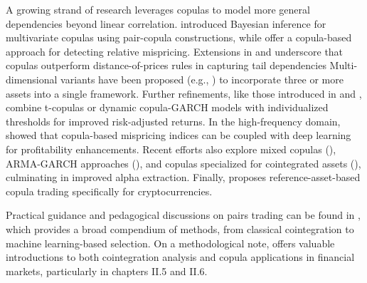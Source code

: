 A growing strand of research leverages copulas to model more general dependencies beyond linear correlation.
\cite{Min2010} introduced Bayesian inference for multivariate copulas using pair-copula constructions, while \cite{stander2013trading} offer a copula-based approach for detecting relative mispricing. 
Extensions in \cite{Liew2013} and \cite{Xie2016} underscore that copulas outperform distance-of-prices rules in capturing tail dependencies 
Multi-dimensional variants have been proposed (e.g., \cite{lau2016multi}) to incorporate three or more assets into a single framework. Further refinements, like those introduced in \cite{Krauss2017} and \cite{zhi2017dynamic}, combine t-copulas or dynamic copula-GARCH models with individualized thresholds for improved risk-adjusted returns. In the high-frequency domain, \cite{Chu2018} showed that copula-based mispricing indices can be coupled with deep learning for profitability enhancements. Recent efforts also explore mixed copulas (\cite{SabinodaSilva2023}), ARMA-GARCH approaches (\cite{Wang2023}), and copulas specialized for cointegrated assets (\cite{He2024}), culminating in improved alpha extraction. Finally, \cite{Tadi2025} proposes reference-asset-based copula trading specifically for cryptocurrencies. 
%

Practical guidance and pedagogical discussions on pairs trading can be found in \cite{hudsonthames2024}, which provides a broad compendium of methods, from classical cointegration to machine learning-based selection. On a methodological note, \cite{alexander2008market} offers valuable introductions to both cointegration analysis and copula applications in financial markets, particularly in chapters II.5 and II.6.


